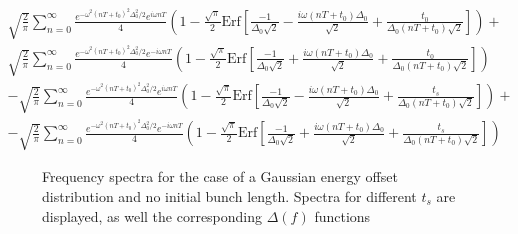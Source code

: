\begin{gather}
\sqrt{\frac{2}{\pi}}\sum^{\infty}_{n=0}\frac{e^{-\omega^2(nT+t_0)^2\Delta^2_0/2}e^{i\omega nT}}{4}\left(1-\frac{\sqrt{\pi}}{2}\text{Erf}\left[\frac{-1}{\Delta_0\sqrt{2}}-\frac{i\omega (nT+t_0)\Delta_0}{\sqrt{2}}+\frac{t_0}{\Delta_0(nT+t_0)\sqrt{2}}\right]\right)+ \nonumber \\
\sqrt{\frac{2}{\pi}}\sum^{\infty}_{n=0}\frac{e^{-\omega^2(nT+t_0)^2\Delta^2_0/2}e^{-i\omega nT}}{4}\left(1-\frac{\sqrt{\pi}}{2}\text{Erf}\left[\frac{-1}{\Delta_0\sqrt{2}}+\frac{i\omega (nT+t_0)\Delta_0}{\sqrt{2}}+\frac{t_0}{\Delta_0(nT+t_0)\sqrt{2}}\right]\right) \nonumber \\
-\sqrt{\frac{2}{\pi}}\sum^{\infty}_{n=0}\frac{e^{-\omega^2(nT+t_0)^2\Delta^2_0/2}e^{i\omega nT}}{4}\left(1-\frac{\sqrt{\pi}}{2}\text{Erf}\left[\frac{-1}{\Delta_0\sqrt{2}}-\frac{i\omega (nT+t_0)\Delta_0}{\sqrt{2}}+\frac{t_s}{\Delta_0(nT+t_0)\sqrt{2}}\right]\right)+ \nonumber \\
-\sqrt{\frac{2}{\pi}}\sum^{\infty}_{n=0}\frac{e^{-\omega^2(nT+t_0)^2\Delta^2_0/2}e^{-i\omega nT}}{4}\left(1-\frac{\sqrt{\pi}}{2}\text{Erf}\left[\frac{-1}{\Delta_0\sqrt{2}}+\frac{i\omega (nT+t_0)\Delta_0}{\sqrt{2}}+\frac{t_s}{\Delta_0(nT+t_0)\sqrt{2}}\right]\right)
\end{gather}

\begin{figure}[bt]
\centering
{}
\caption{Frequency spectra for the case of a Gaussian energy offset distribution and no initial bunch length. Spectra for different $t_s$ are displayed, as well the corresponding $\Delta(f)$ functions}
\label{fig:FT_no_tspread}
\end{figure}

